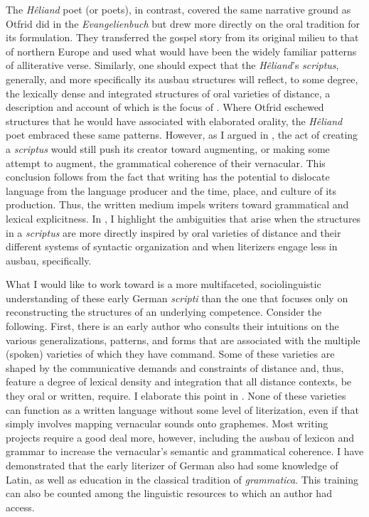 The \textit{Hêliand} poet (or poets), in contrast, covered the same narrative ground as Otfrid did in the \textit{Evangelienbuch} but drew more directly on the oral tradition for its formulation. They transferred the gospel story from its original milieu to that of northern Europe and used what would have been the widely familiar patterns of alliterative verse. Similarly, one should expect that the \textit{Hêliand}’s \textit{scriptus}, generally, and more specifically its ausbau structures will reflect, to some degree, the lexically dense and integrated structures of oral varieties of distance, a description and account of which is the focus of . Where Otfrid eschewed structures that he would have associated with elaborated orality, the \textit{Hêliand} poet embraced these same patterns. However, as I argued in , the act of creating a \textit{scriptus} would still push its creator toward augmenting, or making some attempt to augment, the grammatical coherence of their vernacular. This conclusion follows from the fact that writing has the potential to dislocate language from the language producer and the time, place, and culture of its production. Thus, the written medium impels writers toward grammatical and lexical explicitness. In , I highlight the ambiguities that arise when the structures in a \textit{scriptus} are more directly inspired by oral varieties of distance and their different systems of syntactic organization and when literizers engage less in ausbau, specifically.

What I would like to work toward is a more multifaceted, sociolinguistic understanding of these early German \textit{scripti} than the one that focuses only on reconstructing the structures of an underlying competence. Consider the following. First, there is an early author who consults their intuitions on the various generalizations, patterns, and forms that are associated with the multiple (spoken) varieties of which they have command. Some of these varieties are shaped by the communicative demands and constraints of distance and, thus, feature a degree of lexical density and integration that all distance contexts, be they oral or written, require. I elaborate this point in . None of these varieties can function as a written language without some level of literization, even if that simply involves mapping vernacular sounds onto graphemes. Most writing projects require a good deal more, however, including the ausbau of lexicon and grammar to increase the vernacular’s semantic and grammatical coherence. I have demonstrated that the early literizer of German also had some knowledge of Latin, as well as education in the classical tradition of \textit{grammatica}. This training can also be counted among the linguistic resources to which an author had access.


